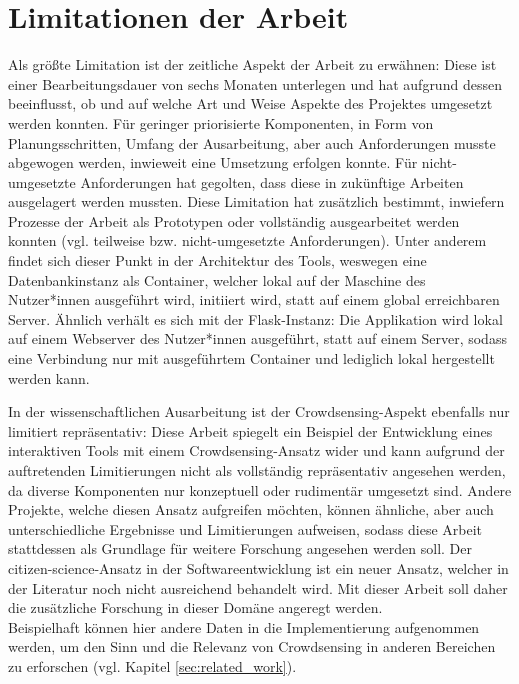 \section{Limitationen der Arbeit}
\label{sec:limitations}
Als größte Limitation ist der zeitliche Aspekt der Arbeit zu erwähnen: Diese ist einer Bearbeitungsdauer von sechs Monaten unterlegen und hat aufgrund dessen beeinflusst, ob und auf welche Art und Weise Aspekte des Projektes umgesetzt werden konnten. Für geringer priorisierte Komponenten, in Form von Planungsschritten, Umfang der Ausarbeitung, aber auch Anforderungen musste abgewogen werden, inwieweit eine Umsetzung erfolgen konnte. Für nicht-umgesetzte Anforderungen hat gegolten, dass diese in zukünftige Arbeiten ausgelagert werden mussten. Diese Limitation hat zusätzlich bestimmt, inwiefern Prozesse der Arbeit als Prototypen oder vollständig ausgearbeitet werden konnten (vgl. teilweise bzw. nicht-umgesetzte Anforderungen). Unter anderem findet sich dieser Punkt in der Architektur des Tools, weswegen eine Datenbankinstanz als Container, welcher lokal auf der Maschine des Nutzer*innen ausgeführt wird, initiiert wird, statt auf einem global erreichbaren Server. Ähnlich verhält es sich mit der Flask-Instanz: Die Applikation wird lokal auf einem Webserver des Nutzer*innen ausgeführt, statt auf einem Server, sodass eine Verbindung nur mit ausgeführtem Container und lediglich lokal hergestellt werden kann.

In der wissenschaftlichen Ausarbeitung ist der Crowdsensing-Aspekt ebenfalls nur limitiert repräsentativ: Diese Arbeit spiegelt ein Beispiel der Entwicklung eines interaktiven Tools mit einem Crowdsensing-Ansatz wider und kann aufgrund der auftretenden Limitierungen nicht als vollständig repräsentativ angesehen werden, da diverse Komponenten nur konzeptuell oder rudimentär umgesetzt sind. Andere Projekte, welche diesen Ansatz aufgreifen möchten, können ähnliche, aber auch unterschiedliche Ergebnisse und Limitierungen aufweisen, sodass diese Arbeit stattdessen als Grundlage für weitere Forschung angesehen werden soll. Der citizen-science-Ansatz in der Softwareentwicklung ist ein neuer Ansatz, welcher in der Literatur noch nicht ausreichend behandelt wird. Mit dieser Arbeit soll daher die zusätzliche Forschung in dieser Domäne angeregt werden. \\ Beispielhaft können hier andere Daten in die Implementierung aufgenommen werden, um den Sinn und die Relevanz von Crowdsensing in anderen Bereichen zu erforschen (vgl. Kapitel \ref{sec:related_work}).

